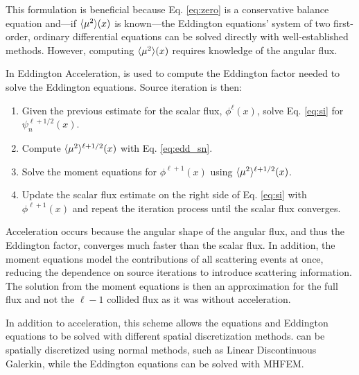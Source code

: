 	This formulation is beneficial because Eq. \ref{eq:zero} is a conservative balance equation and---if $\langle \mu^2 \rangle(x)$ is known---the Eddington equations' system of two first-order, ordinary differential equations can be solved directly with well-established methods. However, computing $\langle \mu^2 \rangle(x)$ requires knowledge of the angular flux. 

	In Eddington Acceleration, \SN is used to compute the Eddington factor needed to solve the Eddington equations. Source iteration is then:  
		\begin{enumerate}
			\item Given the previous estimate for the scalar flux, $\phi^{\ell}(x)$, solve Eq. \ref{eq:si} for $\psi_n^{\ell+1/2}(x)$. 
			\item Compute $\langle \mu^2 \rangle^{\ell+1/2}(x)$ with Eq. \ref{eq:edd_sn}. 
			\item Solve the moment equations for $\phi^{\ell+1}(x)$ using $\langle \mu^2 \rangle^{\ell+1/2}(x)$. 
			\item Update the scalar flux estimate on the right side of Eq. \ref{eq:si} with $\phi^{\ell+1}(x)$ and repeat the iteration process until the scalar flux converges. 
		\end{enumerate}

	Acceleration occurs because the angular shape of the angular flux, and thus the Eddington factor, converges much faster than the scalar flux. In addition, the moment equations model the contributions of all scattering events at once, reducing the dependence on source iterations to introduce scattering information. The solution from the moment equations is then an approximation for the full flux and not the $\ell - 1$ collided flux as it was without acceleration. 

	In addition to acceleration, this scheme allows the \SN equations and Eddington equations to be solved with different spatial discretization methods. \SN can be spatially discretized using normal methods, such as Linear Discontinuous Galerkin, while the Eddington equations can be solved with MHFEM. 

